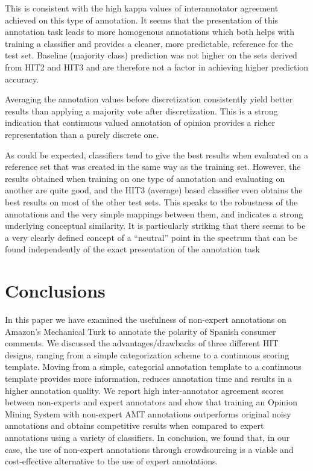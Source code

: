 \documentclass[11pt, a4paper,onecolumn]{article}
\begin{document}
This is consistent with the high kappa values of interannotator agreement achieved on this type of annotation.  It seems that the presentation of this annotation task leads to more homogenous annotations which both helps with training a classifier and provides a cleaner, more predictable, reference for the test set.  Baseline (majority class) prediction was not higher on the sets derived from HIT2 and HIT3 and are therefore not a factor in achieving higher prediction accuracy.

Averaging the annotation values before discretization consistently yield better results than applying a majority vote after discretization.  This is a strong indication that continuous valued annotation of opinion provides a richer representation than a purely discrete one.

As could be expected, classifiers tend to give the best results when evaluated on a reference set that was created in the same way as the training set.  However, the results obtained when training on one type of annotation and evaluating on another are quite good, and the HIT3 (average) based classifier even obtains the best results on most of the other test sets.  This speaks to the robustness of the annotations and the very simple mappings between them, and indicates a strong underlying conceptual similarity.  It is particularly striking that there seems to be a very clearly defined concept of a ``neutral'' point in the spectrum that can be found independently of the exact presentation of the annotation task

\section{Conclusions}
\label{sect:conclusions}


In this paper we have examined the usefulness of non-expert annotations on Amazon's Mechanical Turk to annotate the polarity of Spanish consumer comments. We discussed the advantages/drawbacks of three different HIT designs, ranging from a simple categorization scheme to a continuous scoring template. Moving from a simple, categorial annotation template to a continuous template provides more information, reduces annotation time and results in a higher annotation quality. We report high inter-annotator agreement scores between non-experts and expert annotators and show that training an Opinion Mining System with non-expert AMT annotations outperforms original noisy annotations and obtains competitive results when compared to expert annotations using a variety of classifiers. In conclusion, we found that, in our case, the use of non-expert annotations through crowdsourcing is a viable and cost-effective alternative to the use of expert annotations.
\end{document}
